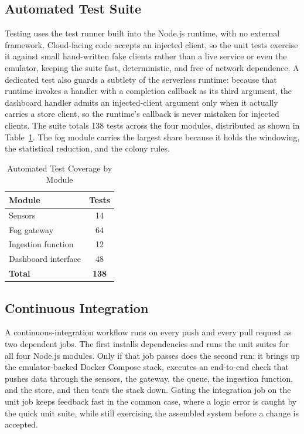 \documentclass[conference]{IEEEtran}
\begin{document}
\subsection{Automated Test Suite}

Testing uses the test runner built into the Node.js runtime, with no external framework. Cloud-facing code accepts an injected client, so the unit tests exercise it against small hand-written fake clients rather than a live service or even the emulator, keeping the suite fast, deterministic, and free of network dependence. A dedicated test also guards a subtlety of the serverless runtime: because that runtime invokes a handler with a completion callback as its third argument, the dashboard handler admits an injected-client argument only when it actually carries a store client, so the runtime's callback is never mistaken for injected clients. The suite totals 138 tests across the four modules, distributed as shown in Table~\ref{tab:tests}. The fog module carries the largest share because it holds the windowing, the statistical reduction, and the colony rules.

\begin{table}[!t]
\caption{Automated Test Coverage by Module}
\label{tab:tests}
\centering
\renewcommand{\arraystretch}{1.3}
\begin{tabular}{@{}lc@{}}
\toprule
\textbf{Module} & \textbf{Tests} \\
\midrule
Sensors & 14 \\
Fog gateway & 64 \\
Ingestion function & 12 \\
Dashboard interface & 48 \\
\midrule
\textbf{Total} & \textbf{138} \\
\bottomrule
\end{tabular}
\end{table}

\subsection{Continuous Integration}

A continuous-integration workflow runs on every push and every pull request as two dependent jobs. The first installs dependencies and runs the unit suites for all four Node.js modules. Only if that job passes does the second run: it brings up the emulator-backed Docker Compose stack, executes an end-to-end check that pushes data through the sensors, the gateway, the queue, the ingestion function, and the store, and then tears the stack down. Gating the integration job on the unit job keeps feedback fast in the common case, where a logic error is caught by the quick unit suite, while still exercising the assembled system before a change is accepted.
\end{document}
